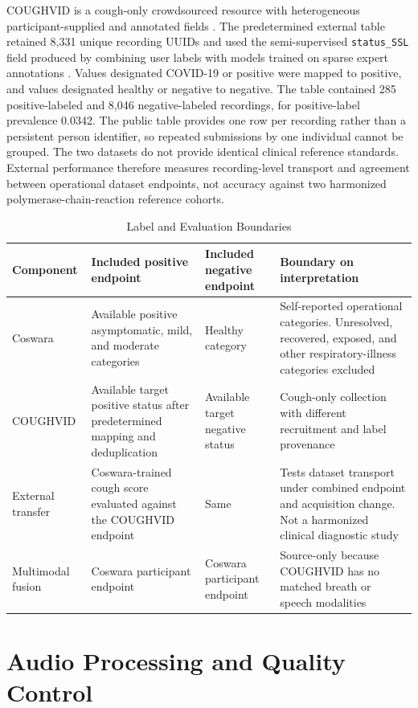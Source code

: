 \documentclass[journal]{IEEEtran}
\begin{document}
COUGHVID is a cough-only crowdsourced resource with heterogeneous participant-supplied and annotated fields \cite{orlandic2021coughvid}. The predetermined external table retained 8,331 unique recording UUIDs and used the semi-supervised \texttt{status\_SSL} field produced by combining user labels with models trained on sparse expert annotations \cite{orlandic2023semisupervised}. Values designated COVID-19 or positive were mapped to positive, and values designated healthy or negative to negative. The table contained 285 positive-labeled and 8,046 negative-labeled recordings, for positive-label prevalence 0.0342. The public table provides one row per recording rather than a persistent person identifier, so repeated submissions by one individual cannot be grouped. The two datasets do not provide identical clinical reference standards. External performance therefore measures recording-level transport and agreement between operational dataset endpoints, not accuracy against two harmonized polymerase-chain-reaction reference cohorts.

\begin{table}[t]
\caption{Label and Evaluation Boundaries}
\label{tab:s_label_boundaries}
\centering
\footnotesize
\begin{tabular}{L{2.1cm}L{3.2cm}L{3.2cm}L{5.6cm}}
\toprule
Component & Included positive endpoint & Included negative endpoint & Boundary on interpretation \\
\midrule
Coswara & Available positive asymptomatic, mild, and moderate categories & Healthy category & Self-reported operational categories. Unresolved, recovered, exposed, and other respiratory-illness categories excluded \\
COUGHVID & Available target positive status after predetermined mapping and deduplication & Available target negative status & Cough-only collection with different recruitment and label provenance \\
External transfer & Coswara-trained cough score evaluated against the COUGHVID endpoint & Same & Tests dataset transport under combined endpoint and acquisition change. Not a harmonized clinical diagnostic study \\
Multimodal fusion & Coswara participant endpoint & Coswara participant endpoint & Source-only because COUGHVID has no matched breath or speech modalities \\
\bottomrule
\end{tabular}
\end{table}

\section{Audio Processing and Quality Control}
\end{document}
